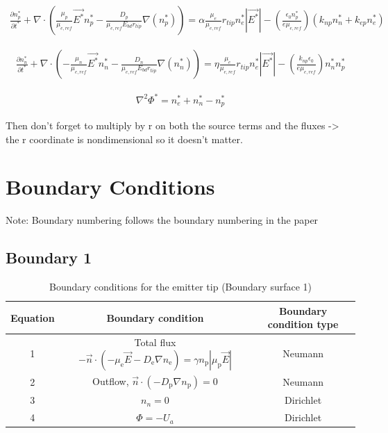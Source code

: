 \documentclass[12pt, a4paper]{report}
\begin{document}
\begin{align*}
        \frac{\partial n_p^* }{\partial t^*} + \nabla \cdot \left(\frac{\mu_p}{\mu_{e,ref}} \vec{E^*}n_p^* - \frac{{D_p}}{\mu_{e,ref} E_{bd}r_{tip}}\nabla (n_p^*)\right) = \alpha \frac{\mu_e}{\mu_{e,ref}}r_{tip} n_e^*|\vec{E^*}| - \left(\frac{\epsilon_0 n_p^*}{e \mu_{e,ref}} \right) \left(k_{np}n_n^* + k_{ep}n_e^*\right)
\end{align*}

\begin{align*}
        \frac{\partial n_n^* }{\partial t^*} + \nabla \cdot \left(-\frac{\mu_n}{\mu_{e,ref}} \vec{E^*}n_n^* - \frac{{D_n}}{\mu_{e,ref} E_{bd}r_{tip}}\nabla (n_n^*)\right) = \eta \frac{\mu_e}{\mu_{e,ref}}r_{tip} n_e^*|\vec{E^*}| - \left(\frac{k_{np} \epsilon_0}{e \mu_{e,ref}} \right) n_n^*n_p^*
\end{align*}

\begin{align*}
    \nabla^2\Phi^* = n_e^*+n_n^*-n_p^*
\end{align*}

Then don't forget to multiply by r on both the source terms and the fluxes -> the r coordinate is nondimensional so it doesn't matter.

\section{\bf \large Boundary Conditions}
Note: Boundary numbering follows the boundary numbering in the paper
\subsection{Boundary 1}

\begin{table}[!h]
    \centering\begin{tabular}{c|c|c}
        Equation & Boundary condition & Boundary condition type\\ \hline
        1 & Total flux $-\vec{n} \cdot\left(-\mu_{\mathrm{e}} \vec{E} -D_{\mathrm{e}} \nabla n_{\mathrm{e}}\right) =\gamma n_{\mathrm{p}}|\mu_{\mathrm{p}} \vec{E}|$ & Neumann \\ \hline
        2 & Outflow, $\vec{n} \cdot\left(-D_{\mathrm{p}} \nabla n_{\mathrm{p}}\right)=0$  & Neumann \\ \hline
        3 & $n_n=0$ & Dirichlet\\ \hline
        4 & $\Phi=-U_a$ & Dirichlet \\ \hline

    \end{tabular}
    \caption{Boundary conditions for the emitter tip (Boundary surface 1)}
\end{table}
\clearpage
\end{document}
